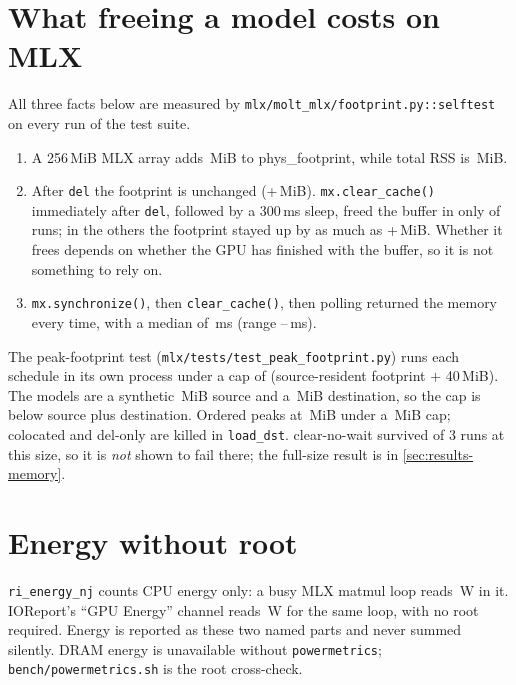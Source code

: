 \section{What freeing a model costs on MLX}\label{app:mlx}
All three facts below are measured by \texttt{mlx/molt\_mlx/footprint.py::selftest} on every run of the test suite.
\begin{enumerate}
\item A 256\,MiB MLX array adds \,MiB to phys\_footprint, while total RSS is \,MiB.
\item After \texttt{del} the footprint is unchanged (+\,MiB).
\texttt{mx.clear\_cache()} immediately after \texttt{del}, followed by a 300\,ms sleep, freed the buffer in only  of  runs; in the others the footprint stayed up by as much as +\,MiB.
Whether it frees depends on whether the GPU has finished with the buffer, so it is not something to rely on.
\item \texttt{mx.synchronize()}, then \texttt{clear\_cache()}, then polling returned the memory every time, with a median of \,ms (range --\,ms).
\end{enumerate}
The peak-footprint test (\texttt{mlx/tests/test\_peak\_footprint.py}) runs each schedule in its own process under a cap of (source-resident footprint $+$ 40\,MiB).
The models are a synthetic \,MiB source and a \,MiB destination, so the cap is below source plus destination.
Ordered peaks at \,MiB under a \,MiB cap; colocated and del-only are killed in \texttt{load\_dst}.
clear-no-wait survived  of 3 runs at this size, so it is \emph{not} shown to fail there; the full-size result is in \cref{sec:results-memory}.

\section{Energy without root}\label{app:energy}
\texttt{ri\_energy\_nj} counts CPU energy only: a busy MLX matmul loop reads \,W in it.
IOReport's ``GPU Energy'' channel reads \,W for the same loop, with no root required.
Energy is reported as these two named parts and never summed silently.
DRAM energy is unavailable without \texttt{powermetrics}; \texttt{bench/powermetrics.sh} is the root cross-check.
